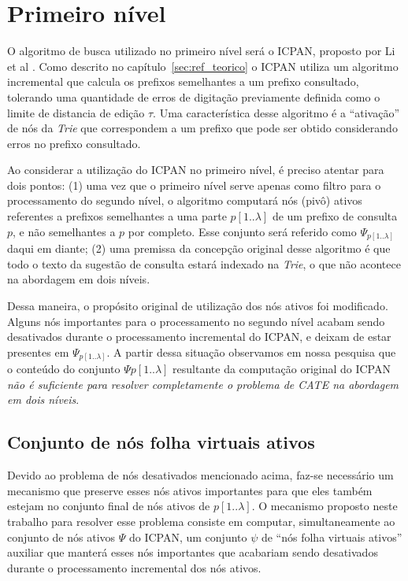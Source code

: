 \section{Primeiro nível}
\label{sec:first-level}

O algoritmo de busca utilizado no primeiro nível será o ICPAN, proposto por Li et al \citep{li2011efficient}. Como descrito no capítulo~\ref{sec:ref_teorico} o ICPAN utiliza um algoritmo incremental que calcula os prefixos semelhantes a um prefixo consultado, tolerando uma quantidade de erros de digitação previamente definida como o limite de distancia de edição $\tau$. Uma característica desse algoritmo é a ``ativação'' de nós da \textit{Trie} que correspondem a um prefixo que pode ser obtido considerando erros no prefixo consultado.

Ao considerar a utilização do ICPAN no primeiro nível, é preciso atentar para dois pontos: (1) uma vez que o primeiro nível serve apenas como filtro para o processamento do segundo nível, o algoritmo computará nós (pivô) ativos referentes a prefixos semelhantes a uma parte $p[1..\lambda]$ de um prefixo de consulta $p$, e não semelhantes a $p$ por completo. Esse conjunto será referido como $\Psi_{p[1..\lambda]}$ daqui em diante; (2) uma premissa da concepção original desse algoritmo é que todo o texto da sugestão de consulta estará indexado na \textit{Trie}, o que não acontece na abordagem em dois níveis.

Dessa maneira, o propósito original de utilização dos nós ativos foi modificado. Alguns nós importantes para o processamento no segundo nível acabam sendo desativados durante o processamento incremental do ICPAN, e deixam de estar presentes em $\Psi_{p[1..\lambda]}$. A partir dessa situação observamos em nossa pesquisa que o conteúdo do conjunto $\Psi{p[1..\lambda]}$ resultante da computação original do ICPAN \textit{não é suficiente para resolver completamente o problema de CATE na abordagem em dois níveis}. 

\subsection{Conjunto de nós folha virtuais ativos}
\label{sec:virtual_leaves_node-set}

Devido ao problema de nós desativados mencionado acima, faz-se necessário um mecanismo que preserve esses nós ativos importantes para que eles também estejam no conjunto final de nós ativos de $p[1..\lambda]$. O mecanismo proposto neste trabalho para resolver esse problema consiste em computar, simultaneamente ao conjunto de nós ativos $\Psi$ do ICPAN, um conjunto $\psi$ de ``nós folha virtuais ativos'' auxiliar que manterá esses nós importantes que acabariam sendo desativados durante o processamento incremental dos nós ativos. 

